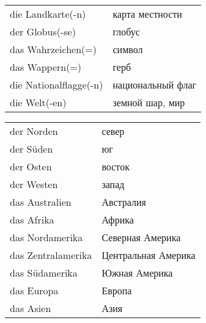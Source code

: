 

\begin{longtable}{|l|l|}
\hline
die Landkarte(-n) & карта местности \\
der Globus(-se) & глобус \\
das Wahrzeichen(=) & символ \\
das Wappern(=) & герб \\
die Nationalflagge(-n) & национальный флаг \\
die Welt(-en) & земной шар, мир \\
\hline
\end{longtable}

\begin{longtable}{|l|l|}
\hline
der Norden & север \\
der S\"uden & юг \\
der Osten & восток \\
der Westen & запад \\
\hline
das Australien & Австралия \\
das Afrika & Африка \\
das Nordamerika & Северная Америка \\
das Zentralamerika & Центральная Америка \\
das S\"udamerika & Южная Америка \\
das Europa & Европа \\
das Asien & Азия \\
\hline 
\end{longtable}

